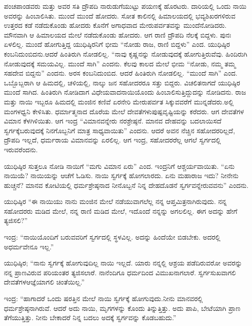 ಪಂಚಪಾಂಡವರು ಮತ್ತು ಅವರ ಸತಿ ದ್ರೌಪದಿ ನಾರುಡುಗೆಯುಟ್ಟು ಪಯಣಕ್ಕೆ ಹೊರಟರು. ದಾರಿಯಲ್ಲಿ ಒಂದು ನಾಯಿ ಅವರನ್ನು ಹಿಂಬಾಲಿಸಿತು. ಮುಂದೆ ಮುಂದೆ ಹೋದರು. ಸೋತ ಕಾಲಿನಲ್ಲಿ ಹಿಮಾಲಯದಲ್ಲಿ ಭವ್ಯಶಿಖರಗಳಿರುವ ಉತ್ತರದ ಕಡೆ ನಡೆದುಕೊಂಡು ಹೋದರು ಕೊನೆಗೆ ಅಗಾಧವಾದ ಮೇರುಪರ್ವತವನ್ನು ಮುಂದೆ\break ನೋಡಿದರು. ಮೌನವಾಗಿ ಆ ಹಿಮಾಲಯದ ಮೇಲೆ ನಡೆದುಕೊಂಡು ಹೋದರು. ಆಗ ರಾಣಿ ದ್ರೌಪದಿ ನೆಲಕ್ಕೆ ಬಿದ್ದಳು. ಪುನಃ ಏಳಲಿಲ್ಲ. ಮುಂದೆ ಹೋಗುತ್ತಿದ್ದ ಯುಧಿಷ್ಠಿರನಿಗೆ ಭೀಮ “ನೋಡು ರಾಜ, ರಾಣಿ ಬಿದ್ದಳು” ಎಂದ. ಯುಧಿಷ್ಠಿರ ಕಂಬನಿದುಂಬಿದನು.\break ಆದರೆ ಹಿಂತಿರುಗಿ ನೋಡಲಿಲ್ಲ. “ನಾವು ಕೃಷ್ಣನನ್ನು ನೋಡುವುದಕ್ಕೆ ಹೋಗುತ್ತಿರುವೆವು. ಹಿಂದಿರುಗಿ ನೋಡುವುದಕ್ಕೆ ಸಮಯವಿಲ್ಲ. ಮುಂದೆ ಸಾಗಿ” ಎಂದನು. ಕೆಲವು ಕಾಲದ ಮೇಲೆ ಭೀಮ “ನೋಡು, ನಮ್ಮ ತಮ್ಮ ಸಹದೇವ ಬಿದ್ದನು” ಎಂದನು. ಅರಸ ಕಂಬನಿದುಂಬಿದ. ಆದರೆ ಹಿಂತಿರುಗಿ ನೋಡಲಿಲ್ಲ. “ಮುಂದೆ ಸಾಗಿ” ಎಂದ. ಒಬ್ಬೊಬ್ಬರಾಗಿ ಆ ಹಿಮದಲ್ಲಿ, ಚಳಿಯಲ್ಲಿ, ನಾಲ್ಕು ಜನ ಸಹೋದರರೂ ಸತ್ತು ಬಿದ್ದರು. ವಿಚಲಿತನಾಗದೆ ಯುಧಿಷ್ಠಿರ ಮುಂದೆ ಸಾಗಿದ. ಹಿಂತಿರುಗಿ ನೋಡಿದಾಗ ವಿಧೇಯವಾದ\break ನಾಯಿಯೊಂದು ಹಿಂಬಾಲಿಸುತ್ತಿದ್ದುದನ್ನು ನೋಡಿದನು. ರಾಜ ಮತ್ತು ನಾಯಿ ಇಬ್ಬರೂ ಹಿಮದಲ್ಲಿ ಮಂಜಿನ ಕಣಿವೆ ಏರನೇರಿ ಮೇರುಪರ್ವತ ಸಿಕ್ಕುವವರೆಗೆ ಮುನ್ನಡೆದರು.\break ಅಲ್ಲಿ ಮಂಗಳಧ್ವನಿ ಕೇಳಿಸಿತು. ಧರ್ಮಾತ್ಮನಾದ ದೊರೆಯ ಮೇಲೆ ದೇವತೆಗಳು\break ಪುಷ್ಪವೃಷ್ಟಿಯನ್ನು ಕರೆದರು. ಆಗ ದೇವತೆಗಳ ವಿಮಾನ ಕೆಳಗಿಳಿಯಿತು. ಆಗ ಇಂದ್ರ “ವಿಮಾನವನ್ನೇರು ನರಶ್ರೇಷ್ಠನೆ. ಮಾನವ ದೇಹವನ್ನು ಬದಲಾಯಿಸದೆ ಸ್ವರ್ಗಕ್ಕೆ\break ಬರುವುದಕ್ಕೆ ನಿನಗೊಬ್ಬನಿಗೆ ಮಾತ್ರ ಸಾಧ್ಯವಾಯಿತು” ಎಂದನು. ಆದರೆ ಅವನ ನೆಚ್ಚಿನ ಸಹೋದರರಿಲ್ಲದೆ, ದ್ರೌಪದಿ ಇಲ್ಲದೆ, ಧರ್ಮರಾಯ ವಿಮಾನವನ್ನು ಏರಲಿಲ್ಲ. ಆಗ ಇಂದ್ರ, ಸಹೋದರರೆಲ್ಲ ಆಗಲೆ ಸ್ವರ್ಗದಲ್ಲಿ ಇರುವರೆಂದನು.

\vskip 0.1cm

ಯುಧಿಷ್ಠಿರ ಸುತ್ತಲೂ ನೋಡಿ ನಾಯಿಗೆ “ಮಗು ವಿಮಾನ ಏರು” ಎಂದ. ಇಂದ್ರನಿಗೆ ಆಶ್ಚರ್ಯವಾಯಿತು. “ಏನು ನಾಯಿಯೆ? ನಾಯಿಯನ್ನು ಆಚೆಗೆ ಓಡಿಸು. ನಾಯಿ ಸ್ವರ್ಗಕ್ಕೆ ಹೋಗಲಾರದು. ಏನು ಮಹಾರಾಜ ಇದು? ನೀನೇನು ಹುಚ್ಚನೆ? ಮಾನವ ಕೋಟಿಯಲ್ಲಿ ಧರ್ಮಶ್ರೇಷ್ಠನಾದ ನೀನೊಬ್ಬನೆ ನಿನ್ನ ದೇಹದೊಡನೆ ಸ್ವರ್ಗವನ್ನೇರುವವನು” ಎಂದನು.

\vskip 0.1cm

ಯುಧಿಷ್ಠಿರ “ಈ ನಾಯಿಯು ನಾನು ಮಂಜಿನ ಮೇಲೆ ನಡೆಯುವಾಗಲೆಲ್ಲ ನನ್ನ ಆಪ್ತಮಿತ್ರನಾಗಿರುವುದು. ನನ್ನ ಸಹೋದರರು ಮಡಿದ ಮೇಲೆ, ನನ್ನ ರಾಣಿ ಮಡಿದ ಮೇಲೆ, ಇದೊಂದೆ ನನ್ನನ್ನು ಅಗಲಲಿಲ್ಲ. ಈಗ ಅದನ್ನು ಹೇಗೆ ತ್ಯಜಿಸಲಿ?”

\vskip 0.1cm

ಇಂದ್ರ: “ನಾಯಿಯೊಂದಿಗೆ ಬರುವವರಿಗೆ ಸ್ವರ್ಗದಲ್ಲಿ ಸ್ಥಳವಿಲ್ಲ. ಅದನ್ನು ಹಿಂದೆಯೇ ಬಿಡಬೇಕು. ಅದರಲ್ಲಿ ಅಧರ್ಮವೇನೂ ಇಲ್ಲ.”

\vskip 0.1cm

ಯುಧಿಷ್ಠಿರ; “ನಾನು ಸ್ವರ್ಗಕ್ಕೆ ಹೋಗುವುದಿಲ್ಲ ನಾಯಿ ಇಲ್ಲದೆ. ಯಾರು ನನ್ನಲ್ಲಿ ಆಶ್ರಯ ಪಡೆದಿರುವರೋ ಅವರನ್ನು ನನ್ನ ಪ್ರಾಣವಿರುವ ಪರಿಯಂತರ ತ್ಯಜಿಸಲಾರೆ. ನಾನೆಂದಿಗೂ ಧರ್ಮದಿಂದ ವಿಮುಖನಾಗಲಾರೆ. ಸ್ವರ್ಗಸುಖವಾಗಲಿ ದೇವತೆಗಳ\break ಆಜ್ಞೆಯಾಗಲಿ ಚಿಂತೆಯಿಲ್ಲ.”

\vskip 0.1cm

ಇಂದ್ರ: “ಹಾಗಾದರೆ ಒಂದು ಷರತ್ತಿನ ಮೇಲೆ ನಾಯಿ ಸ್ವರ್ಗಕ್ಕೆ ಹೋಗುವುದು.\break ನೀನು ಮಾನವರಲ್ಲಿ ಧರ್ಮಶ್ರೇಷ್ಠನಾಗಿರುವೆ. ಆದರೆ ಅದು ನಾಯಿ, ಮೃಗಗಳನ್ನು ಕೊಂದು ತಿನ್ನುತ್ತಿತ್ತು. ಅದು ಪಾಪಿ, ಬೇಟೆಯಾಗಿ ಪ್ರಾಣ ತೆಗೆಯುತ್ತಿತ್ತು. ನೀನು ಬೇಕಾದರೆ ನಿನ್ನ ಬದಲು ಅದಕ್ಕೆ ಸ್ವರ್ಗವನ್ನು ಕೊಡಬಹುದು.”

